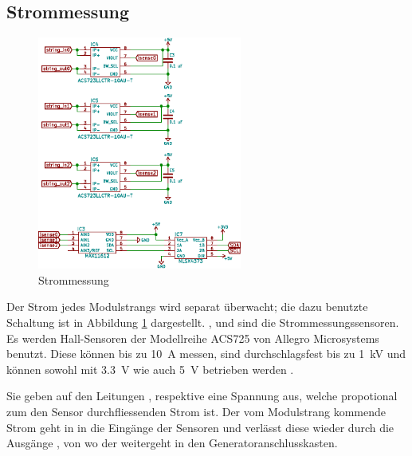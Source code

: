 \clearpage
\subsection{Strommessung}
\label{subsec:hw:master:current}


\begin{figure}[h!t]
    \centering
    \includegraphics[width=0.60\textwidth]{images/superv-sch/supervisor--sch--current.eps}
    \caption{Strommessung}
    \label{fig:sch:master:current}
\end{figure}


Der  Strom jedes  Modulstrangs  wird separat  \"uberwacht;  die dazu  benutzte
Schaltung   ist   in   Abbildung   \ref{fig:sch:master:current}   dargestellt.
,    und    sind  die  Strommessungssensoren. Es
werden  Hall-Sensoren   der  Modellreihe   ACS725  von   Allegro  Microsystems
benutzt. Diese k\"onnen bis zu  \SI{10}{\ampere} messen, sind durchschlagsfest
bis zu  \SI{1}{\kilo\volt} und  k\"onnen sowohl  mit \SI{3.3}{\volt}  wie auch
\SI{5}{\volt} betrieben werden \cite{datasheet:hallic}.

Sie  geben   auf  den  Leitungen  ,     respektive
  eine   Spannung  aus,   welche  propotional  zum   den  Sensor
durchfliessenden Strom ist. Der vom Modulstrang  kommende Strom geht in in die
Eing\"ange  der Sensoren und verl\"asst diese wieder
durch die Ausg\"ange , von wo der weitergeht in den
Generatoranschlusskasten.

